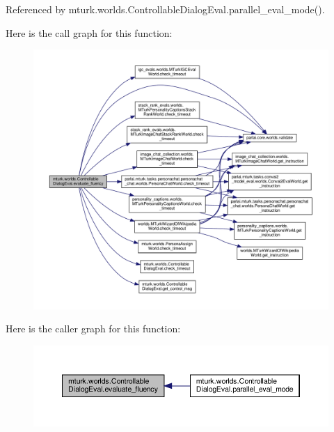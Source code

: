 Referenced by mturk.\+worlds.\+Controllable\+Dialog\+Eval.\+parallel\+\_\+eval\+\_\+mode().

Here is the call graph for this function\+:
\nopagebreak
\begin{figure}[H]
\begin{center}
\leavevmode
\includegraphics[width=350pt]{classmturk_1_1worlds_1_1ControllableDialogEval_a6208c058cb87f311f1362f597af72130_cgraph}
\end{center}
\end{figure}
Here is the caller graph for this function\+:
\nopagebreak
\begin{figure}[H]
\begin{center}
\leavevmode
\includegraphics[width=350pt]{classmturk_1_1worlds_1_1ControllableDialogEval_a6208c058cb87f311f1362f597af72130_icgraph}
\end{center}
\end{figure}
\mbox{\label{classmturk_1_1worlds_1_1ControllableDialogEval_a0c80a0ddf95145c0a632c07ff7bbe99e}} 
